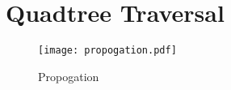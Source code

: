 
\section{Quadtree Traversal}
\label{sec:quadtree_traversal}

\begin{figure}[tbhp]
	\centering
	\texttt{[image: propogation.pdf]}
	\caption{Propogation}
	\label{fig:propogation}
\end{figure}
